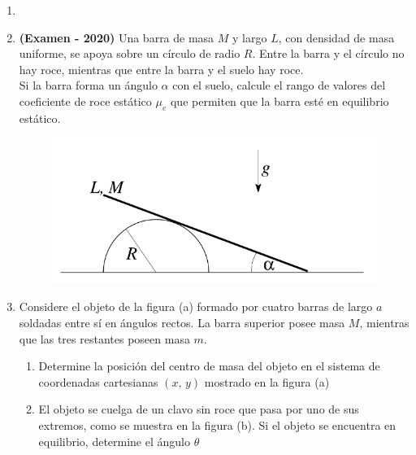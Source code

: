 \documentclass[letterpaper,11pt]{article}
\begin{document}
\vspace{-1cm}
\begin{enumerate}\setlength{\itemsep}{0.4cm}\addtocounter{enumi}{0}


\item[]

\item \textbf{(Examen - 2020)} Una barra de masa $M$ y largo $L$, con densidad de masa uniforme, se apoya sobre un círculo de radio $R$. Entre la barra y el círculo no hay roce, mientras que entre la barra y el suelo hay roce. \\

Si la barra forma un ángulo $\alpha$ con el suelo, calcule el rango de valores del coeficiente
de roce estático $\mu_e$ que permiten que la barra esté en equilibrio estático.

\begin{figure}[H]
    \centering
    \includegraphics[width=0.5\linewidth]{2022-2/Imagenes/Capsula2/p1.png}
\end{figure}




    


\item Considere el objeto de la figura (a) formado por cuatro barras de largo $a$ soldadas entre sí en ángulos rectos. La barra superior posee masa $M$, mientras que las tres restantes poseen masa $m$.

\begin{enumerate}
    \item Determine la posición del centro de masa del objeto en el sistema de coordenadas cartesianas $(x, \, y)$ mostrado en la figura (a)
    
    \item El objeto se cuelga de un clavo sin roce que pasa por uno de sus extremos, como se muestra en la figura (b). Si el objeto se encuentra en equilibrio, determine el ángulo $\theta$
\end{enumerate}


\end{enumerate}
\end{document}

